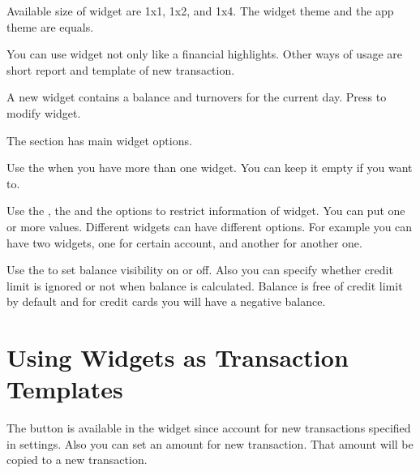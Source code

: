 \documentclass[a4paper,10pt,english]{sphinxmanual}
\begin{document}

\sphinxAtStartPar
Available size of widget are 1x1, 1x2, and 1x4. The widget theme and the app theme are equals.

\sphinxAtStartPar
You can use widget not only like a financial highlights. Other ways of usage are short report
and template of new transaction.

\noindent{}

\noindent{}

\noindent{}

\sphinxAtStartPar
A new widget contains a balance and turnovers for the current day. Press 
to modify widget.

\sphinxAtStartPar
The  section has main widget options.

\sphinxAtStartPar
Use the  when you have more than one widget. You can keep it empty if you want to.

\sphinxAtStartPar
Use the , the  and the  options
to restrict information of widget. You can put one or more values. Different widgets
can have different options. For example you can have two widgets, one for
certain account, and another for another one.

\sphinxAtStartPar
Use the  to set balance visibility on or off. Also you can specify
whether credit limit is ignored or not when balance is calculated.
Balance is free of credit limit by default and for credit cards
you will have a negative balance.

\noindent{}

\noindent{}


\section{Using Widgets as Transaction Templates}
\label{\detokenize{widgets:using-widgets-as-transaction-templates}}
\sphinxAtStartPar
The  button is available in the widget since account for new transactions specified in
settings. Also you can set an amount for new transaction. That amount will be copied to a new transaction.
\end{document}
